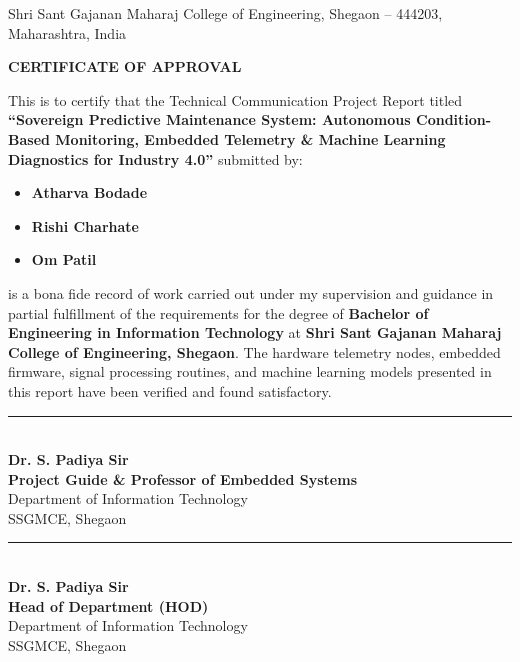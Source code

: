 \documentclass[12pt,a4paper,oneside]{report}
\begin{document}
\begin{titlepage}
\begin{center}
\vfill
{\footnotesize Shri Sant Gajanan Maharaj College of Engineering, Shegaon -- 444203, Maharashtra, India}

\end{center}
\end{titlepage}

\newpage
\thispagestyle{plain}
\begin{center}
    {\Large \textbf{CERTIFICATE OF APPROVAL}}\\[10mm]
\end{center}

\noindent This is to certify that the Technical Communication Project Report titled \textbf{``Sovereign Predictive Maintenance System: Autonomous Condition-Based Monitoring, Embedded Telemetry \& Machine Learning Diagnostics for Industry 4.0''} submitted by:
\begin{itemize}[noitemsep,topsep=2pt]
    \item \textbf{Atharva Bodade}
    \item \textbf{Rishi Charhate}
    \item \textbf{Om Patil}
\end{itemize}
is a bona fide record of work carried out under my supervision and guidance in partial fulfillment of the requirements for the degree of \textbf{Bachelor of Engineering in Information Technology} at \textbf{Shri Sant Gajanan Maharaj College of Engineering, Shegaon}. The hardware telemetry nodes, embedded firmware, signal processing routines, and machine learning models presented in this report have been verified and found satisfactory.

\vspace{25mm}

\noindent
\begin{minipage}[t]{0.48\textwidth}
    \centering
    \rule{55mm}{0.4pt}\\[1.5mm]
    \textbf{Dr. S. Padiya Sir}\\[1mm]
    \textbf{Project Guide \& Professor of Embedded Systems}\\[1mm]
    Department of Information Technology\\
    SSGMCE, Shegaon
\end{minipage}
\hfill
\begin{minipage}[t]{0.48\textwidth}
    \centering
    \rule{55mm}{0.4pt}\\[1.5mm]
    \textbf{Dr. S. Padiya Sir}\\[1mm]
    \textbf{Head of Department (HOD)}\\[1mm]
    Department of Information Technology\\
    SSGMCE, Shegaon
\end{minipage}
\end{document}
